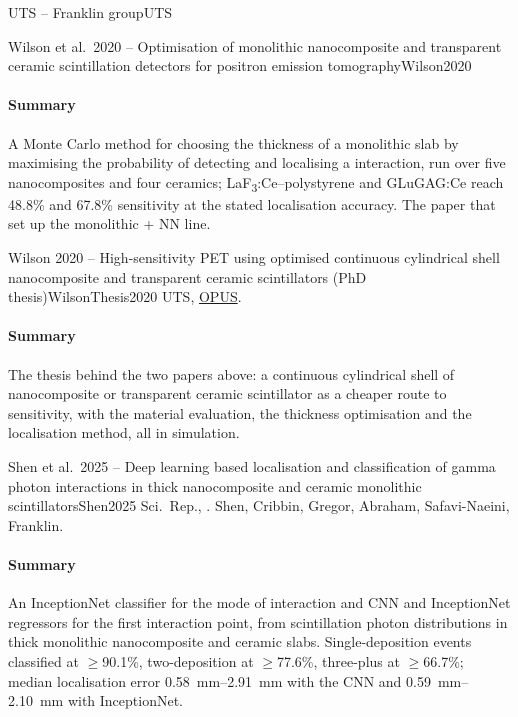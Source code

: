 \begin{programnote}{UTS -- Franklin group}{UTS}
\begin{papernote}{Wilson et al.\ 2020 -- Optimisation of monolithic nanocomposite and transparent ceramic scintillation detectors for positron emission tomography}{Wilson2020}
\paragraph{Summary}
A Monte Carlo method for choosing the thickness of a monolithic slab by
maximising the probability of detecting and localising a 
interaction, run over five nanocomposites and four ceramics; LaF\textsubscript{3}:Ce--polystyrene
and GLuGAG:Ce reach 48.8\% and 67.8\% sensitivity at the stated localisation
accuracy. The paper that set up the monolithic + NN line.

\end{papernote}

\begin{papernote}{Wilson 2020 -- High-sensitivity PET using optimised continuous cylindrical shell nanocomposite and transparent ceramic scintillators (PhD thesis)}{WilsonThesis2020}
UTS, \href{https://opus.lib.uts.edu.au/handle/10453/147336}{OPUS}.

\paragraph{Summary}
The thesis behind the two papers above: a continuous cylindrical shell of
nanocomposite or transparent ceramic scintillator as a cheaper route to
sensitivity, with the material evaluation, the thickness optimisation and the
localisation method, all in simulation.

\end{papernote}

\begin{papernote}{Shen et al.\ 2025 -- Deep learning based localisation and classification of gamma photon interactions in thick nanocomposite and ceramic monolithic scintillators}{Shen2025}
Sci.\ Rep., . Shen, Cribbin, Gregor, Abraham,
Safavi-Naeini, Franklin.

\paragraph{Summary}
An InceptionNet classifier for the mode of interaction and CNN and
InceptionNet regressors for the first interaction point, from scintillation
photon distributions in thick monolithic nanocomposite and ceramic slabs.
Single-deposition events classified at $\geq$90.1\%, two-deposition at
$\geq$77.6\%, three-plus at $\geq$66.7\%; median localisation error
\qtyrange{0.58}{2.91}{\milli\metre} with the CNN and
\qtyrange{0.59}{2.10}{\milli\metre} with InceptionNet.


\end{papernote}
\end{programnote}
